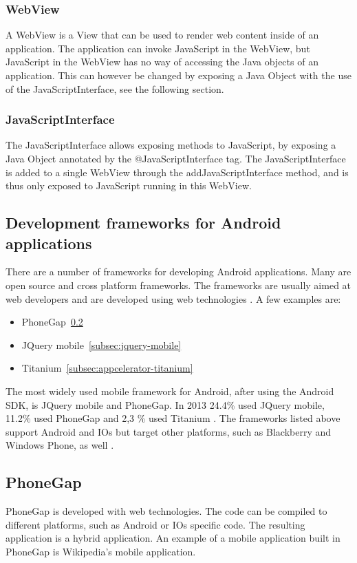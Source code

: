 \subsubsection{WebView}\label{subsubsec:webview}
A WebView \cite{webview2015} is a View \cite{view2015} that can be used to render web content inside of an application. The application can invoke JavaScript in the WebView, but JavaScript in the WebView has no way of accessing the Java objects of an application. This can however be changed by exposing a Java Object with the use of the JavaScriptInterface, see the following section.

\subsubsection{JavaScriptInterface}\label{subsubsec:javascriptinterface}
The JavaScriptInterface \cite{jsi2015} allows exposing methods to JavaScript, by exposing a Java Object annotated by the @JavaScriptInterface tag. The JavaScriptInterface is added to a single WebView through the addJavaScriptInterface method, and is thus only exposed to JavaScript running in this WebView.

\subsection{Development frameworks for Android applications}\label{subsec:development-frameworks-for-android-applications}
There are a number of frameworks for developing Android applications. Many are open source and cross platform frameworks. The frameworks are usually aimed at web developers and are developed using web technologies \cite{mondal2013}. A few examples are:

\begin{itemize}
\item PhoneGap~\ref{subsec:phonegap}
\item JQuery mobile~\ref{subsec:jquery-mobile}
\item Titanium~\ref{subsec:appcelerator-titanium}
\end{itemize}

The most widely used mobile framework for Android, after using the Android SDK, is JQuery mobile and PhoneGap. In 2013 24.4\% used JQuery mobile, 11.2\% used PhoneGap and 2,3 \% used Titanium \cite{eclipse2013}. The frameworks listed above support Android and IOs but target other platforms, such as Blackberry and Windows Phone, as well \cite{mondal2013}. 

\subsection{PhoneGap} \label{subsec:phonegap}
PhoneGap is developed with web technologies. The code can be compiled to different platforms, such as Android or IOs specific code. The resulting application is a hybrid application. An example of a mobile application built in PhoneGap is Wikipedia's mobile application.

